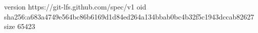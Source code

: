 version https://git-lfs.github.com/spec/v1
oid sha256:a683a4749e564bc86b6169d1d84ed264a134bbab0bc4b32f5c1943dccab82627
size 65423

